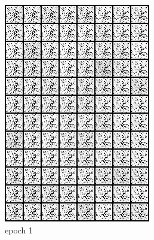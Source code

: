 \documentclass[a4paper]{article}
\theoremstyle{definition}
\newenvironment{soln}{
	\leavevmode\color{blue}\ignorespaces
}{}
\begin{document}
\begin{enumerate} [label=(\alph*)]
\begin{soln}
			\begin{figure}[H]
				\centering
				\begin{subfigure}[b]{0.3\textwidth}
					\centering
					\includegraphics[width=\textwidth]{outputs/b.gen_img1.png}
					\caption{epoch 1}
				\end{subfigure}
				\hfill
				\begin{subfigure}[b]{0.3\textwidth}
					\centering

\end{subfigure}
\end{figure}
\end{soln}
\end{enumerate}
\end{document}
